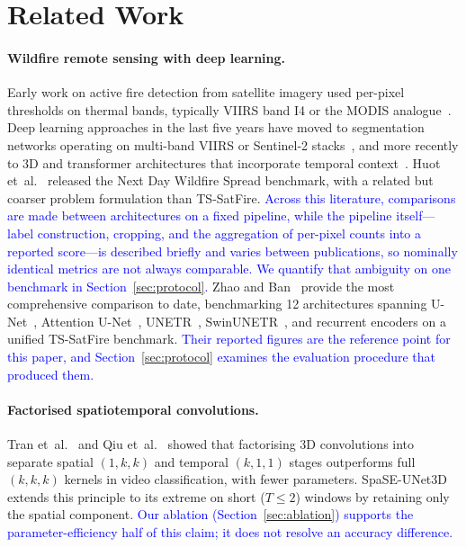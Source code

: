 \documentclass[sensors,article,submit,moreauthors,pdftex]{Definitions/mdpi}
\newcommand{\rev}[1]{\textcolor{blue}{#1}}
\begin{document}
\section{Related Work}
\label{sec:related}

\paragraph*{Wildfire remote sensing with deep learning.} Early work on active fire detection from satellite imagery used per-pixel thresholds on thermal bands, typically VIIRS band I4 or the MODIS analogue~\cite{giglio2016collection,schroeder2014new}. Deep learning approaches in the last five years have moved to segmentation networks operating on multi-band VIIRS or Sentinel-2 stacks~\cite{pinto2020deep}, and more recently to 3D and transformer architectures that incorporate temporal context~\cite{moskolai2021application}. Huot et~al.~\cite{huot2022next} released the Next Day Wildfire Spread benchmark, with a related but coarser problem formulation than TS-SatFire. \rev{Across this literature, comparisons are made between architectures on a fixed pipeline, while the pipeline itself---label construction, cropping, and the aggregation of per-pixel counts into a reported score---is described briefly and varies between publications, so nominally identical metrics are not always comparable. We quantify that ambiguity on one benchmark in Section~\ref{sec:protocol}.} Zhao and Ban~\cite{zhao2025tssatfire} provide the most comprehensive comparison to date, benchmarking 12 architectures spanning U-Net~\cite{ronneberger2015unet}, Attention U-Net~\cite{oktay2018attention}, UNETR~\cite{hatamizadeh2022unetr}, SwinUNETR~\cite{hatamizadeh2022swin}, and recurrent encoders on a unified TS-SatFire benchmark. \rev{Their reported figures are the reference point for this paper, and Section~\ref{sec:protocol} examines the evaluation procedure that produced them.}

\paragraph*{Factorised spatiotemporal convolutions.} Tran et~al.~\cite{tran2018closer} and Qiu et~al.~\cite{qiu2017learning} showed that factorising 3D convolutions into separate spatial $(1, k, k)$ and temporal $(k, 1, 1)$ stages outperforms full $(k, k, k)$ kernels in video classification, with fewer parameters. SpaSE-UNet3D extends this principle to its extreme on short ($T \leq 2$) windows by retaining only the spatial component. \rev{Our ablation (Section~\ref{sec:ablation}) supports the parameter-efficiency half of this claim; it does not resolve an accuracy difference.}
\end{document}
